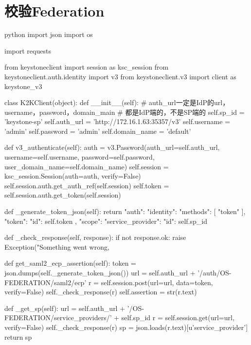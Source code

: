 \section{校验Federation}
\begin{code-block}{python}
import json
import os

import requests

from keystoneclient import session as ksc_session
from keystoneclient.auth.identity import v3
from keystoneclient.v3 import client as keystone_v3


class K2KClient(object):
    def __init__(self):
        # auth_url一定是IdP的url，username，password，domain_main
        # 都是IdP端的，不是SP端的
        self.sp_id = 'keystone-sp'
        self.auth_url = 'http://172.16.1.63:35357/v3'
        self.username = 'admin'
        self.password = 'admin'
        self.domain_name = 'default'

    def v3_authenticate(self):
        auth = v3.Password(auth_url=self.auth_url,
                           username=self.username,
                           password=self.password,
                           user_domain_name=self.domain_name)
        self.session = ksc_session.Session(auth=auth, verify=False)
        self.session.auth.get_auth_ref(self.session)
        self.token = self.session.auth.get_token(self.session)

    def _generate_token_json(self):
        return {
            "auth": {
                "identity": {
                    "methods": [
                        "token"
                    ],
                    "token": {
                        "id": self.token
                    }
                },
                "scope": {
                    "service_provider": {
                        "id": self.sp_id
                    }
                }
            }
        }

    def _check_response(self, response):
        if not response.ok:
            raise Exception("Something went wrong, %

    def get_saml2_ecp_assertion(self):
        token = json.dumps(self._generate_token_json())
        url = self.auth_url + '/auth/OS-FEDERATION/saml2/ecp'
        r = self.session.post(url=url, data=token, verify=False)
        self._check_response(r)
        self.assertion = str(r.text)

    def _get_sp(self):
        url = self.auth_url + '/OS-FEDERATION/service_providers/' + self.sp_id
        r = self.session.get(url=url, verify=False)
        self._check_response(r)
        sp = json.loads(r.text)[u'service_provider']
        return sp


\end{code-block}
